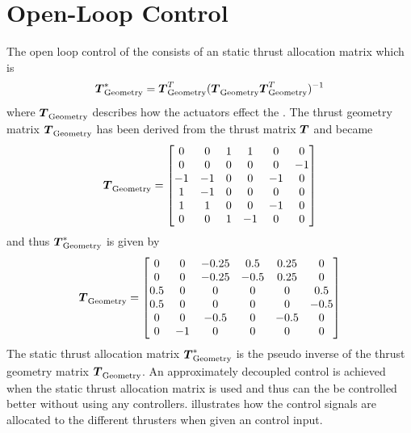 \section{Open-Loop Control} \label{sec:openloop}   
The open loop control of the \abbrROV consists of an static thrust allocation matrix which is
\begin{equation}
    \thrusterGeometryOnes[*] = \thrusterGeometryOnes[T](\thrusterGeometryOnes \thrusterGeometryOnes[T])^{-1}
\end{equation}
where $\thrusterGeometryOnes$ describes how the actuators effect the \abbrROV \citep{thrustallocation}. The thrust geometry matrix $\thrusterGeometryOnes$ has been derived from the thrust matrix $\thrusterGeometry$ and became 
\begin{equation*}
    \thrusterGeometryOnes = 
    \begin{bmatrix}
    0  & 0  & 1 & 1  &  0 &  0 \\
    0  & 0  & 0 & 0  &  0 & -1 \\
    -1 & -1 & 0 & 0  & -1 &  0 \\
    1  & -1 & 0 & 0  &  0 &  0 \\
    1  & 1  & 0 & 0  & -1 &  0 \\
    0  & 0  & 1 & -1 &  0 &  0 \\
    \end{bmatrix}
\end{equation*}
and thus $\thrusterGeometryOnes[*]$ is given by
\begin{equation}
\thrusterGeometryOnes= \begin{bmatrix}
0 & 0 & -0.25 & 0.5 & 0.25 & 0 \\
0 & 0 & -0.25 & -0.5 & 0.25 & 0 \\
0.5 & 0 & 0 & 0 & 0 & 0.5 \\
0.5 & 0 & 0 & 0 & 0 & -0.5 \\
0 & 0 & -0.5 & 0 & -0.5 & 0 \\
0 & -1 & 0 & 0 & 0 & 0 \\
\end{bmatrix}
\end{equation}
The static thrust allocation matrix $\thrusterGeometryOnes[*]$ is the pseudo inverse of the thrust geometry matrix $\thrusterGeometryOnes$. An approximately decoupled control is achieved when the static thrust allocation matrix is used and thus can the \abbrROV be controlled better without using any controllers.  illustrates how the control signals are allocated to the different thrusters when given an control input.

